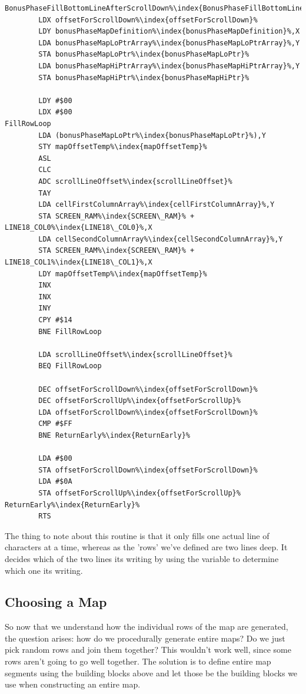 \begin{minipage}[b]{0.45\linewidth}
\centering
\begin{lstlisting}[basicstyle=\tiny,escapechar=\%]
BonusPhaseFillBottomLineAfterScrollDown%\index{BonusPhaseFillBottomLineAfterScrollDown}%   
        LDX offsetForScrollDown%\index{offsetForScrollDown}%
        LDY bonusPhaseMapDefinition%\index{bonusPhaseMapDefinition}%,X
        LDA bonusPhaseMapLoPtrArray%\index{bonusPhaseMapLoPtrArray}%,Y
        STA bonusPhaseMapLoPtr%\index{bonusPhaseMapLoPtr}%
        LDA bonusPhaseMapHiPtrArray%\index{bonusPhaseMapHiPtrArray}%,Y
        STA bonusPhaseMapHiPtr%\index{bonusPhaseMapHiPtr}%

        LDY #$00
        LDX #$00
FillRowLoop
        LDA (bonusPhaseMapLoPtr%\index{bonusPhaseMapLoPtr}%),Y
        STY mapOffsetTemp%\index{mapOffsetTemp}%
        ASL 
        CLC 
        ADC scrollLineOffset%\index{scrollLineOffset}%
        TAY 
        LDA cellFirstColumnArray%\index{cellFirstColumnArray}%,Y
        STA SCREEN_RAM%\index{SCREEN\_RAM}% + LINE18_COL0%\index{LINE18\_COL0}%,X
        LDA cellSecondColumnArray%\index{cellSecondColumnArray}%,Y
        STA SCREEN_RAM%\index{SCREEN\_RAM}% + LINE18_COL1%\index{LINE18\_COL1}%,X
        LDY mapOffsetTemp%\index{mapOffsetTemp}%
        INX 
        INX 
        INY 
        CPY #$14
        BNE FillRowLoop

        LDA scrollLineOffset%\index{scrollLineOffset}%
        BEQ FillRowLoop

        DEC offsetForScrollDown%\index{offsetForScrollDown}%
        DEC offsetForScrollUp%\index{offsetForScrollUp}%
        LDA offsetForScrollDown%\index{offsetForScrollDown}%
        CMP #$FF
        BNE ReturnEarly%\index{ReturnEarly}%

        LDA #$00
        STA offsetForScrollDown%\index{offsetForScrollDown}%
        LDA #$0A
        STA offsetForScrollUp%\index{offsetForScrollUp}%
ReturnEarly%\index{ReturnEarly}%
        RTS 
\end{lstlisting}
\end{minipage}

The thing to note about this routine is that it only fills one actual line of characters
at a time, whereas as the 'rows' we've defined are two lines deep. It decides which of the
two lines its writing by using the  variable to determine which
one its writing.

\subsection{Choosing a Map}
So now that we understand how the individual rows of the map are generated, the question
arises: how do we procedurally generate entire maps? Do we just pick random rows and 
join them together? This wouldn't work well, since some rows aren't going to go well
together. The solution is to define entire map segments using the building blocks above
and let those be the building blocks we use when constructing an entire map.

